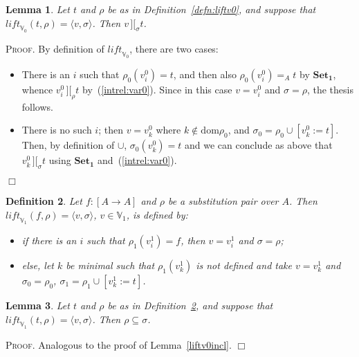 \documentclass{article}
\newtheorem{definition}{Definition}[section]
\newtheorem{lemma}[definition]{Lemma}
\newenvironment{proof}{\smallskip\textsc{Proof.}}{\hspace*{\fill}$\Box$}
\newcommand{\intII}{\,]\![}
\newcommand{\intrel}{\mathbin{\intII_{\rho}}}
\newcommand{\V}{{\mathbb V}}
\newcommand{\axiom}[1]{\ensuremath{\mathbf{#1}}}
\newcommand{\liftv}[1]{\ensuremath{\mathit{lift}_{\V_{#1}}}}
\newcommand{\dom}{\ensuremath{\mathrm{dom}}}
\newcommand{\intrels}{\mathbin{\intII_{\sigma}}}
\begin{document}
\begin{lemma}\label{liftv0corr}
Let $t$ and $\rho$ be as in Definition~\ref{defn:liftv0}, and suppose
that $\liftv0(t,\rho)=\langle v,\sigma\rangle$.  Then $v\intrels t$.
\end{lemma}
\begin{proof}
By definition of \liftv0, there are two cases:
\begin{itemize}
\item There is an $i$ such that $\rho_0(v^0_i)=t$, and then also
$\rho_0(v^0_i)=_A t$ by \axiom{Set_1}, whence $v^0_i\intrel t$
by~(\ref{intrel:var0}).  Since in this case $v=v^0_i$ and
$\sigma=\rho$, the thesis follows.
\item There is no such $i$; then $v=v^0_k$ where $k\not\in\dom\rho_0$,
and $\sigma_0=\rho_0\cup[v^0_k:=t]$.  Then, by definition of $\cup$,
$\sigma_0(v^0_k)=t$ and we can conclude as above that $v^0_k\intrels t$
using \axiom{Set_1} and~(\ref{intrel:var0}).
\end{itemize}
\end{proof}

\begin{definition}\label{defn:liftv1}
Let $f:[A\to A]$ and $\rho$ be a substitution pair over $A$.  Then
$\liftv1(f,\rho)=\langle v,\sigma\rangle$, $v\in\V_1$, is defined by:
\begin{itemize}
\item if there is an $i$ such that $\rho_1(v^1_i)=f$, then $v=v^1_i$ and
$\sigma=\rho$;
\item else, let $k$ be minimal such that $\rho_1(v^1_k)$ is not defined
and take $v=v^1_k$ and $\sigma_0=\rho_0$, $\sigma_1=\rho_1\cup[v^1_k:=t]$.
\end{itemize}
\end{definition}

\begin{lemma}\label{liftv1incl}
Let $t$ and $\rho$ be as in Definition~\ref{defn:liftv1}, and suppose
that $\liftv1(t,\rho)=\langle v,\sigma\rangle$.  Then $\rho\subseteq\sigma$.
\end{lemma}
\begin{proof}
Analogous to the proof of Lemma~\ref{liftv0incl}.
\end{proof}
\end{document}
